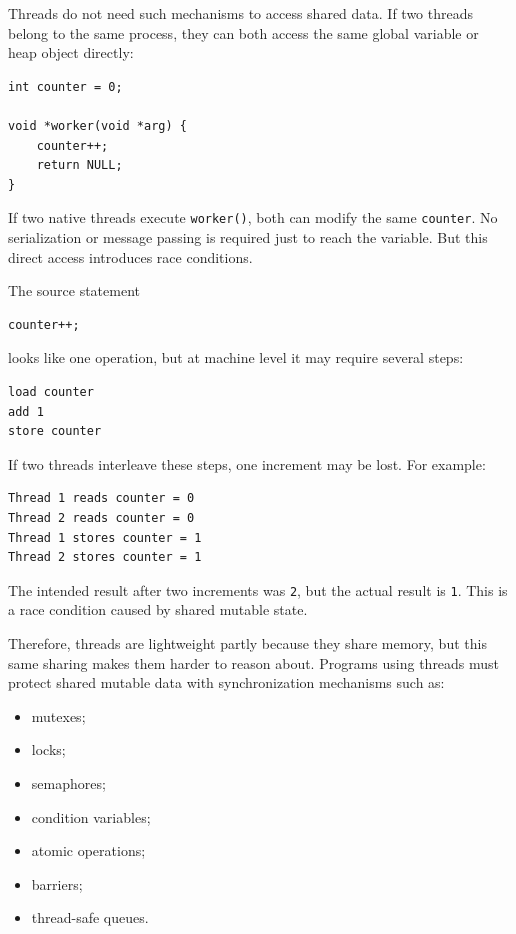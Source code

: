 Threads do not need such mechanisms to access shared data. If two threads belong to the same process, they can both access the same global variable or heap object directly:

\begin{verbatim}
int counter = 0;

void *worker(void *arg) {
    counter++;
    return NULL;
}
\end{verbatim}

If two native threads execute \texttt{worker()}, both can modify the same \texttt{counter}. No serialization or message passing is required just to reach the variable. But this direct access introduces race conditions.

The source statement

\begin{verbatim}
counter++;
\end{verbatim}

looks like one operation, but at machine level it may require several steps:

\begin{verbatim}
load counter
add 1
store counter
\end{verbatim}

If two threads interleave these steps, one increment may be lost. For example:

\begin{verbatim}
Thread 1 reads counter = 0
Thread 2 reads counter = 0
Thread 1 stores counter = 1
Thread 2 stores counter = 1
\end{verbatim}

The intended result after two increments was \texttt{2}, but the actual result is \texttt{1}. This is a race condition caused by shared mutable state.

Therefore, threads are lightweight partly because they share memory, but this same sharing makes them harder to reason about. Programs using threads must protect shared mutable data with synchronization mechanisms such as:

\begin{itemize}
    \item mutexes;
    \item locks;
    \item semaphores;
    \item condition variables;
    \item atomic operations;
    \item barriers;
    \item thread-safe queues.
\end{itemize}

